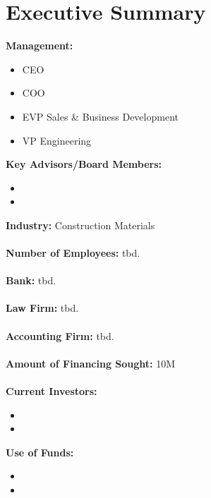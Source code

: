 \newcommand{\mgtext}[1]{{\textbf{#1}}}
\begin{minipage}[t][\textheight][t]{\textwidth}
\section*{Executive Summary}
\begin{multicols}{2}
\begin{small}
	\begin{minipage}[t][\textheight][t]{.45\textwidth}
		\begin{fminipage}{\textwidth}

			\mgtext{Management:}
			\begin{tiny}
				\begin{itemize}
					\item CEO
					\item COO
					\item EVP Sales \& Business Development
					\item VP Engineering
				\end{itemize}
			\end{tiny}
			\mgtext{Key Advisors/Board Members:}
			\begin{tiny}
				\begin{itemize}
					\item
					\item
				\end{itemize}
			\end{tiny}
			\mgtext{Industry: } Construction Materials\\
			\\\mgtext{Number of Employees:} tbd.\\
			\\\mgtext{Bank:} tbd.\\
			\\\mgtext{Law Firm:} tbd.\\
			\\\mgtext{Accounting Firm:} tbd.\\
			\\\mgtext{Amount of Financing Sought:} \textdollaroldstyle10M\\
			\\\mgtext{Current Investors:}
			\begin{tiny}
				\begin{itemize}
					\item
					\item
				\end{itemize}
			\end{tiny}
			\mgtext{Use of Funds:}
			\begin{tiny}
				\begin{itemize}
					\item
					\item
				\end{itemize}
			\end{tiny}
		\end{fminipage}	

\end{minipage}
\end{small}
\end{multicols}
\end{minipage}
